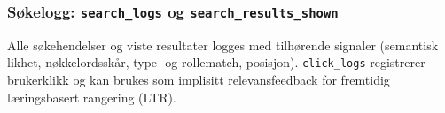 \subsubsection*{Søkelogg: \texttt{search\_logs} og \texttt{search\_results\_shown}}

Alle søkehendelser og viste resultater logges med tilhørende signaler
(semantisk likhet, nøkkelordsskår, type- og rollematch, posisjon).
\texttt{click\_logs} registrerer brukerklikk og kan brukes som implisitt
relevansfeedback for fremtidig læringsbasert rangering (LTR).
